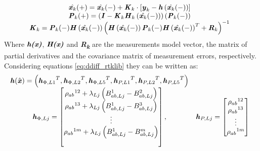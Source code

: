 \begin{equation} 
	\begin{matrix} 
		\hat{\textbf{\textit{x}}_{k}}(+)= \hat{\textbf{\textit{x}}_{k}}(-) + \textbf{\textit{K}}_{k}\cdot \left[ \textbf{\textit{y}}_{k}-\textbf{\textit{h}}\left(\hat{\textbf{\textit{x}}_{k}}(-)\right) \right]\\ 
		\textbf{\textit{P}}_{k}(+)= \left(\textbf{\textit{I}}-\textbf{\textit{K}}_{k} \textbf{\textit{H}}_{k}\left(\hat{\textbf{\textit{x}}_{k}}(-) \right)\right) \left( \textbf{\textit{P}}_{k}(-)\right)\\
		\textbf{\textit{K}}_{k}= \textbf{\textit{P}}_{k}(-)\textbf{\textit{H}} \left( \hat{\textbf{\textit{x}}_{k}}(-) \right) \left( \textbf{\textit{H}} \left( \hat{\textbf{\textit{x}}_{k}}(-) \right) \textbf{\textit{P}}_{k}(-) \textbf{\textit{H}} \left( \hat{\textbf{\textit{x}}_{k}}(-) \right)^{T} + \textbf{\textit{R}}_{k} \right)^{-1}
		\end{matrix}
	\\
	\label{eq:EKF_rtklib}
\end{equation}
Where $\textbf{\textit{h(x)}}$, $\textbf{\textit{H(x)}}$ and \textbf{\textit{R\textsubscript{k}}} are the measurements model vector, the
matrix of partial derivatives and the covariance matrix of
measurement errors, respectively. Considering equations \ref{eq:ddiff_rtklib} they can be written as:
\begin{equation} 
	\begin{matrix} 
		\textbf{\textit{h}}(\hat{\textbf{\textit{x}}})= \left( {\textbf{\textit{h}}_{\Phi,L1}}^{T}, {\textbf{\textit{h}}_{\Phi,L2}}^{T},  {\textbf{\textit{h}}_{\Phi,L5}}^{T}, {\textbf{\textit{h}}_{P,L1}}^{T}, {\textbf{\textit{h}}_{P,L2}}^{T}, {\textbf{\textit{h}}_{P,L5}}^{T}\right)\\
		\textbf{\textit{h}}_{\Phi,Lj} = \begin{bmatrix} 
                {\rho_{ab}}^{12} + \lambda_{Lj} \left( B_{ab,Lj}^{1} - B_{ab,Lj}^{2} \right)  \\
                {\rho_{ab}}^{13} + \lambda_{Lj} \left( B_{ab,Lj}^{1} - B_{ab,Lj}^{3} \right)  \\
                \vdots\\
               {\rho_{ab}}^{1m} + \lambda_{Lj} \left( B_{ab,Lj}^{1} - B_{ab,Lj}^{m} \right)  \\ \\
                \end{bmatrix}, & \textbf{\textit{h}}_{P,Lj} = \begin{bmatrix} 
                {\rho_{ab}}^{12}  \\
                {\rho_{ab}}^{13}  \\
                \vdots\\
               {\rho_{ab}}^{1m}  \\
                \end{bmatrix} 
        
		\end{matrix} \\
	\label{eq:EKF_rtklib_h}
\end{equation}

